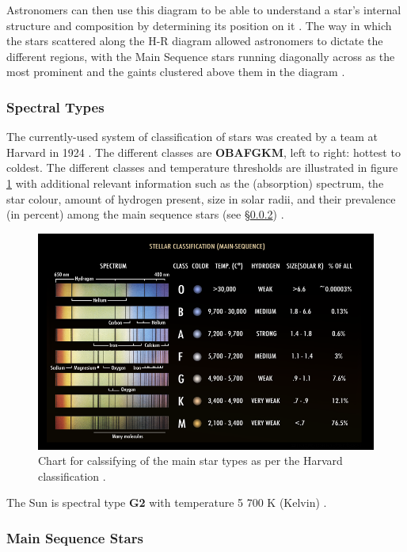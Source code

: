 \documentclass[12pt]{article}
\begin{document}
Astronomers can then use this diagram to be able to understand a star's internal structure and composition by determining its position on it \cite{cosmoshr,brithr}.
The way in which the stars scattered along the H-R diagram allowed astronomers to dictate the different regions, with the Main Sequence stars running diagonally across as
the most prominent and the gaints clustered above them in the diagram \cite{lcohr,cosmoshr}.

\subsubsection{Spectral Types} \label{sec:1.2.1}

The currently-used system of classification of stars was created by a team at Harvard in 1924 \cite{harvardstar}. The different classes are \textbf{OBAFGKM}, left to right: hottest to coldest.
The different classes and temperature thresholds are illustrated in figure \ref{fig:starclassy} with additional relevant information such as the (absorption) spectrum, the star colour, amount of hydrogen present, 
size in solar radii, and their prevalence (in percent) among the main sequence stars (see §\ref{sec:1.2.2})
\cite{lcostar,cosmosstar}.

\begin{figure}[H]
    \centering
    \includegraphics[width=12.5cm]{Stellar_Classification_Chart.png}
    \caption{\centering Chart for calssifying of the main star types as per the Harvard classification \protect\cite{wikistar}.}
    \label{fig:starclassy}
\end{figure}

The Sun is spectral type \textbf{G2} with temperature 5 700 K (Kelvin) \cite{cosmosstar}.

\subsubsection{Main Sequence Stars} \label{sec:1.2.2}
\end{document}
